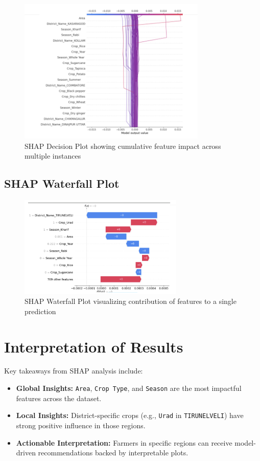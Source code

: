\documentclass[a4paper,11pt,oneside]{book}
\begin{document}
\begin{figure}[h!]
    \centering
    \includegraphics[width=0.8\textwidth]{decision.png}
    \caption{SHAP Decision Plot showing cumulative feature impact across multiple instances}
    \label{fig:shap-decision}
\end{figure}

\subsection{SHAP Waterfall Plot}

\begin{figure}[h!]
    \centering
    \includegraphics[width=0.7\textwidth]{waterfall.png}
    \caption{SHAP Waterfall Plot visualizing contribution of features to a single prediction}
    \label{fig:shap-waterfall}
\end{figure}

\section{Interpretation of Results}

Key takeaways from SHAP analysis include:
\begin{itemize}
    \item \textbf{Global Insights:} \texttt{Area}, \texttt{Crop Type}, and \texttt{Season} are the most impactful features across the dataset.
    \item \textbf{Local Insights:} District-specific crops (e.g., \texttt{Urad} in \texttt{TIRUNELVELI}) have strong positive influence in those regions.
    \item \textbf{Actionable Interpretation:} Farmers in specific regions can receive model-driven recommendations backed by interpretable plots.
\end{itemize}
\end{document}
